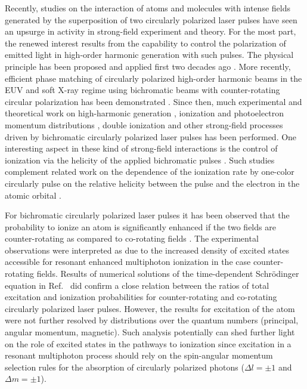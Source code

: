 Recently, studies on the interaction of atoms and molecules with intense fields generated by the superposition of two circularly polarized laser pulses have seen an upsurge in activity in strong-field experiment and theory. For the most part, the renewed interest results from the capability to control the polarization of emitted light in high-order harmonic generation with such pulses. The physical principle has been proposed and applied first two decades ago 
\cite{eichmann95,long95}. 
More recently, efficient phase matching of circularly polarized high-order harmonic beams in the EUV and soft X-ray regime using bichromatic beams with counter-rotating circular polarization has been demonstrated \cite{fleischer14,pisanty14,kfir15,fan15,hickstein15}. Since then, much experimental and theoretical work on high-harmonic generation \cite{milosevic15a,medisauskas15,milosevic15b,chen16,baykusheva16,hernandez16,liu16,mauger16,bandrauk16,reich16b,odzak16,dorney17,fleischer17,zhavoronkov17,pisanty17,baykusheva17,lerner17,ayuso18,dixit18,barreau18,huang18,jimenez18,heslar18,paufler18,li19}, 
ionization and photoelectron momentum distributions
\cite{ngoko15,yuan16,milosevic16c,mancuso16,milosevic16b,mancuso17,pengel17,busuladzic17,hoang17,lin17,abusamha18,busuladzic18,eckart18,li18,han18,eckart18b,liu18,eicke19,ge19,kerbstadt19,abusamha19}, double ionization 
\cite{mancuso16b,eckart16,ben17,ngoko17,yu18,huang18b,ma19}
and other strong-field processes \cite{yuan15,buica18,guo19} driven by bichromatic circularly polarized laser pulses has been performed. One interesting aspect in these kind of strong-field interactions is the control of ionization via the helicity of the applied bichromatic pulses \cite{milosevic16c,mancuso16,liu18}. Such studies complement related work on the dependence of the ionization rate by one-color circularly pulse on the relative helicity between the pulse and the electron in the atomic orbital
\cite{barth11,kazansky12,herath12,barth13,bauer14,barth14,ooi14,hartung16,douguet16,watzel16,wang17,zhang17,eckart18c,liu18b,trabert18}.

For bichromatic circularly polarized laser pulses it has been observed that the probability to ionize an atom is significantly enhanced if the two fields are counter-rotating as compared to co-rotating fields \cite{mancuso16}. The experimental observations were interpreted as due to the increased density of excited states accessible for resonant enhanced multiphoton ionization in the case counter-rotating fields. Results of numerical solutions of the time-dependent Schr\"odinger equation in Ref.\ \cite{mancuso16} did confirm a close relation between the ratios of total excitation and ionization probabilities for counter-rotating and co-rotating circularly polarized laser pulses. However, the results for excitation of the atom were not further resolved by distributions over the quantum numbers (principal, angular momentum, magnetic). Such analysis potentially can shed further light on the role of excited states in the pathways to ionization since excitation in a resonant multiphoton process should rely on the spin-angular momentum selection rules for the absorption of circularly polarized photons ($\Delta l = \pm 1$ and $\Delta m = \pm 1$).

